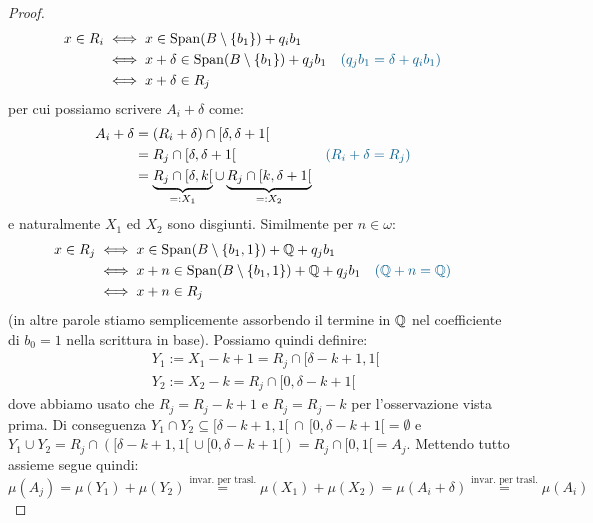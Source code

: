\begin{proof}
	\begin{align*}
		x \in R_i &\iff x \in \Span(B \setminus\{b_1\}) + q_ib_1 \\
				  &\iff x + \delta \in \Span(B \setminus\{b_1\}) + q_jb_1 &&\textcolor{MidnightBlue}{(q_jb_1 = \delta + q_ib_1)} \\
				  &\iff x + \delta \in R_j
	\end{align*}
	per cui possiamo scrivere $A_i+\delta$ come:
	\begin{align*}
		A_i + \delta &= (R_i + \delta) \cap [\delta,\delta + 1[ \\
					 &= R_j \cap [\delta,\delta + 1[ &&\textcolor{MidnightBlue}{(R_i + \delta = R_j)}\\
					 &= \underbrace{R_j \cap [\delta,k[}_{=: X_1} \cup \underbrace{R_j \cap [k,\delta + 1[}_{=: X_2}
	\end{align*}
	e naturalmente $X_1$ ed $X_2$ sono disgiunti. Similmente per $n \in \omega$:
	\begin{align*}
		x \in R_j &\iff x \in \Span(B \setminus\{b_1,1\}) + \QQ + q_jb_1 \\
				  &\iff x + n \in \Span(B \setminus\{b_1,1\}) + \QQ + q_jb_1 &&\textcolor{MidnightBlue}{(\QQ + n = \QQ)} \\
				  &\iff x + n \in R_j
	\end{align*}
	(in altre parole stiamo semplicemente assorbendo il termine in $\mathbb Q$ nel coefficiente di $b_0 = 1$ nella scrittura in base). Possiamo quindi definire:
	\begin{align*}
		&Y_1 := X_1 - k + 1 = R_j \cap [\delta - k + 1, 1[ \\
		&Y_2 := X_2 - k = R_j \cap [0,\delta - k + 1[
	\end{align*}
	dove abbiamo usato che $R_j = R_j - k + 1$ e $R_j = R_j - k$ per l'osservazione vista prima.
	Di conseguenza $Y_1 \cap Y_2 \subseteq [\delta - k + 1, 1[ \, \cap \,[0,\delta - k + 1[ = \emptyset$ e $Y_1 \cup Y_2 = R_j \cap ([\delta - k + 1, 1[ \, \cup [0,\delta - k + 1[) = R_j \cap [0,1[ = A_j$.
	Mettendo tutto assieme segue quindi:
	\[ \mu(A_j) = \mu(Y_1) + \mu(Y_2) \overset{\text{invar. per trasl.}}{=} \mu(X_1) + \mu(X_2) = \mu(A_i + \delta) \overset{\text{invar. per trasl.}}{=} \mu(A_i)
		\]
\end{proof}


